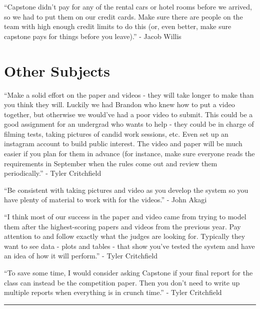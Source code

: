 {``Capstone didn't pay for any of the rental cars or hotel rooms before
we arrived, so we had to put them on our credit cards. Make sure there
are people on the team with high enough credit limits to do this (or,
even better, make sure capstone pays for things before you leave).'' -
Jacob Willis}

\hypertarget{h.b3bhon3qhxn5}{\section{\texorpdfstring{{Other
Subjects}}{Other Subjects}}\label{h.b3bhon3qhxn5}}

{``Make a solid effort on the paper and videos - they will take longer
to make than you think they will. Luckily we had Brandon who knew how to
put a video together, but otherwise we would've had a poor video to
submit. This could be a good assignment for an undergrad who wants to
help - they could be in charge of filming tests, taking pictures of
candid work sessions, etc. Even set up an instagram account to build
public interest. The video and paper will be much easier if you plan for
them in advance (for instance, make sure everyone reads the requirements
in September when the rules come out and review them periodically.'' -
Tyler Critchfield}

{}

{``Be consistent with taking pictures and video as you develop the
system so you have plenty of material to work with for the videos.'' -
John Akagi}

{}

{``I think most of our success in the paper and video came from trying
to model them after the highest-scoring papers and videos from the
previous year. Pay attention to and follow exactly what the judges are
looking for. Typically they want to see data - plots and tables - that
show you've tested the system and have an idea of how it will perform.''
- Tyler Critchfield}

{}

{``To save some time, I would consider asking Capstone if your final
report for the class can instead be the competition paper. Then you
don't need to write up multiple reports when everything is in crunch
time.'' - Tyler Critchfield}

\begin{center}\rule{0.5\linewidth}{\linethickness}\end{center}

\section{\texorpdfstring{{}}{}}\label{h.f26pqemlytf7}

